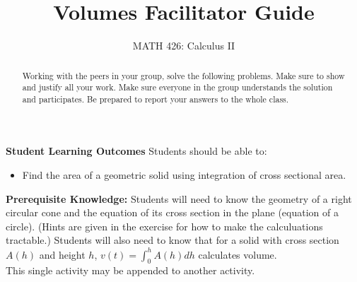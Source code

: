 \documentclass{ximera}
\title{Volumes Facilitator Guide}
\author{MATH 426: Calculus II}
\begin{document}
\begin{abstract}
   Working with the peers in your group, solve the following problems. Make sure to show and justify all your work. Make sure everyone in the group understands the solution and participates. Be prepared to report your answers to the whole class. 
\end{abstract}
\maketitle

\textbf{Student Learning Outcomes}
Students should be able to:
    \begin{itemize}
        \item Find the area of a geometric solid using integration of cross sectional area.
    \end{itemize}

\textbf{Prerequisite Knowledge:} Students will need to know the geometry of a right circular cone and the equation of its cross section in the plane (equation of a circle).  (Hints are given in the exercise for how to make the calculuations tractable.)  Students will also need to know that for a solid with cross section $A(h)$ and height $h$, $v(t)=\int_0^h A(h)dh$ calculates volume.\\

This single activity may be appended to another activity. 
\end{document}
